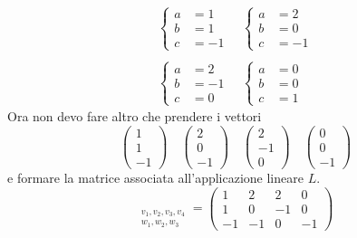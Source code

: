 \begin{example}
\begin{gather*}
		\begin{cases}
			a & = 1  \\
			b & = 1  \\
			c & = -1
		\end{cases}
		\quad
		\begin{cases}
			a & = 2  \\
			b & = 0  \\
			c & = -1
		\end{cases} \\
		\\
		\begin{cases}
			a & = 2  \\
			b & = -1 \\
			c & = 0
		\end{cases}
		\quad
		\begin{cases}
			a & = 0 \\
			b & = 0 \\
			c & = 1
		\end{cases}
	\end{gather*}
	Ora non devo fare altro che prendere i vettori
	\begin{equation*}
		\begin{pmatrix}
			1 \\ 1 \\ -1
		\end{pmatrix}
		\quad
		\begin{pmatrix}
			2 \\ 0 \\ -1
		\end{pmatrix}
		\quad
		\begin{pmatrix}
			2 \\ -1 \\ 0
		\end{pmatrix}
		\quad
		\begin{pmatrix}
			0 \\ 0 \\ -1
		\end{pmatrix}
	\end{equation*}
	e formare la matrice associata all'applicazione lineare $L$.
	\begin{equation*}
		[L]_{\substack{v_1, v_2, v_3, v_4 \\
				w_1, w_2, w_3}} =
		\begin{pmatrix}
			1  & 2  & 2  & 0  \\
			1  & 0  & -1 & 0  \\
			-1 & -1 & 0  & -1
		\end{pmatrix}
	\end{equation*}
\end{example}

